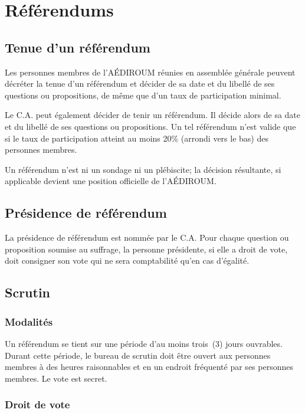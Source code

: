 \documentclass{aediroum}
\begin{document}
\section{Référendums}\label{sec:referendums}

\subsection{Tenue d'un référendum}\label{sec:tenue-dun-referendum}

Les personnes membres de l'AÉDIROUM réunies en assemblée générale peuvent décréter la tenue d'un référendum et décider de sa date et du libellé de ses questions ou propositions, de même que d'un taux de participation minimal.

Le C.A. peut également décider de tenir un référendum. Il décide alors de sa date et du libellé de ses questions ou propositions. Un tel référendum n'est valide que si le taux de participation atteint au moins 20\% (arrondi vers le bas) des personnes membres.

Un référendum n'est ni un sondage ni un plébiscite; la décision résultante, si applicable devient une position officielle de l'AÉDIROUM.

\subsection{Présidence de référendum}\label{sec:president-de-referendum}

La présidence de référendum est nommée par le C.A. Pour chaque question ou proposition soumise au suffrage, la personne présidente, si elle a droit de vote, doit consigner son vote qui ne sera comptabilité qu'en cas d'égalité.

\subsection{Scrutin}\label{sec:scrutin}

\subsubsection{Modalités}\label{sec:modalites-scrutin}

Un référendum se tient sur une période d'au moins trois~(3) jours ouvrables. Durant cette période, le bureau de scrutin doit être ouvert aux personnes membres à des heures raisonnables et en un endroit fréquenté par ses personnes membres. Le vote est secret.

\subsubsection{Droit de vote}\label{sec:droit-de-vote}
\end{document}
